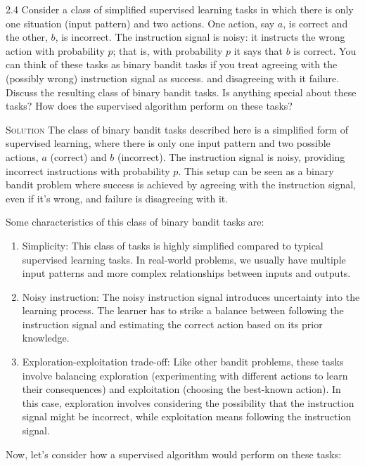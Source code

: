 \documentclass{article}
\begin{document}
2.4 Consider a class of simplified supervised learning tasks in which 
there is only one situation (input pattern) and two actions. One 
action, say $a$, is correct and the other, $b$, is incorrect. The 
instruction signal is noisy: it instructs the wrong action with 
probability $p$; that is, with probability $p$ it says that $b$ 
is correct. You can think of these tasks as binary bandit tasks if 
you treat agreeing with the (possibly wrong) instruction 
signal as success. and disagreeing with it failure. Discuss the 
resulting class of binary bandit tasks. Is anything special about 
these tasks? How does the supervised algorithm perform on 
these tasks?

\textsc{Solution} The class of binary bandit tasks described here 
is a simplified form of supervised learning, where there is only one 
input pattern and two possible actions, $a$ (correct) and $b$ 
(incorrect). The instruction signal is noisy, providing 
incorrect instructions with probability $p$. This setup can be 
seen as a binary bandit problem where success is achieved by 
agreeing with the instruction signal, even if it's wrong, and 
failure is disagreeing with it.

Some characteristics of this class of binary bandit tasks are:

\begin{enumerate}
\item Simplicity: This class of tasks is highly simplified 
compared to typical supervised learning tasks. In real-world 
problems, we usually have multiple input patterns and more complex 
relationships between inputs and outputs.

\item Noisy instruction: The noisy instruction signal introduces 
uncertainty into the learning process. The learner has to strike 
a balance between following the instruction signal and estimating 
the correct action based on its prior knowledge.

\item Exploration-exploitation trade-off: Like other bandit 
problems, these tasks involve balancing exploration 
(experimenting with different actions to learn their 
consequences) and exploitation (choosing the best-known action). 
In this case, exploration involves considering the possibility that 
the instruction signal might be incorrect, while exploitation 
means following the instruction signal.
\end{enumerate}

Now, let's consider how a supervised algorithm would perform 
on these tasks:
\end{document}
